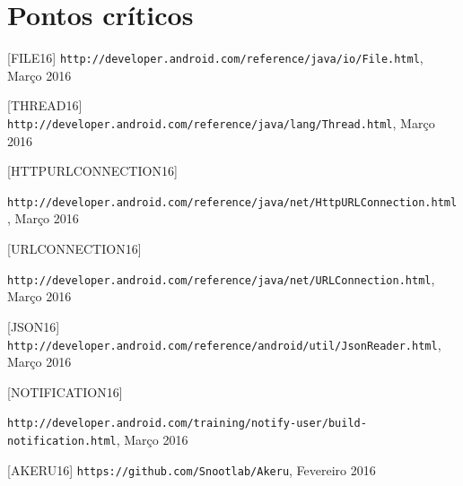\documentclass[a4paper]{article}
\begin{document}
\section{Pontos críticos}


\begin{thebibliography}{9}

  [FILE16] \texttt{http://developer.android.com/reference/java/io/File.html}, Março 2016
  
  [THREAD16] \texttt{http://developer.android.com/reference/java/lang/Thread.html}, Março 2016
  
  [HTTPURLCONNECTION16] \begin{sloppypar} \texttt{http://developer.android.com/reference/java/net/HttpURLConnection.html}, Março 2016 \end{sloppypar}
  
  [URLCONNECTION16] \begin{sloppypar}\texttt{http://developer.android.com/reference/java/net/URLConnection.html}, Março 2016 \end{sloppypar}
  
  [JSON16] \texttt{http://developer.android.com/reference/android/util/JsonReader.html}, Março 2016
  
  [NOTIFICATION16] \begin{sloppypar}\texttt{http://developer.android.com/training/notify-user/build-notification.html}, Março 2016 \end{sloppypar}
  
  [AKERU16] \texttt{https://github.com/Snootlab/Akeru}, Fevereiro 2016


\end{thebibliography}
\end{document}
